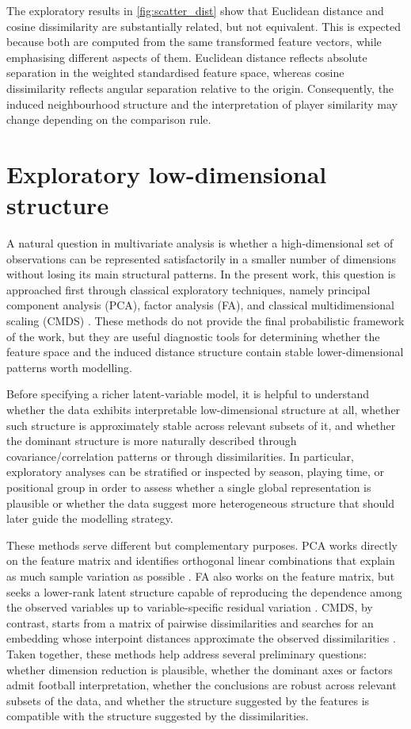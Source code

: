 The exploratory results in \autoref{fig:scatter_dist} show that Euclidean distance and cosine dissimilarity are substantially related, but not equivalent. This is expected because both are computed from the same transformed feature vectors, while emphasising different aspects of them. Euclidean distance reflects absolute separation in the weighted standardised feature space, whereas cosine dissimilarity reflects angular separation relative to the origin. Consequently, the induced neighbourhood structure and the interpretation of player similarity may change depending on the comparison rule.

\section{Exploratory low-dimensional structure}

A natural question in multivariate analysis is whether a high-dimensional set of observations can be represented satisfactorily in a smaller number of dimensions without losing its main structural patterns. In the present work, this question is approached first through classical exploratory techniques, namely principal component analysis (PCA), factor analysis (FA), and classical multidimensional scaling (CMDS) \cite{jolliffe2002pca,bartholomew2011latent,borg2005mds}. These methods do not provide the final probabilistic framework of the work, but they are useful diagnostic tools for determining whether the feature space and the induced distance structure contain stable lower-dimensional patterns worth modelling.

Before specifying a richer latent-variable model, it is helpful to understand whether the data exhibits interpretable low-dimensional structure at all, whether such structure is approximately stable across relevant subsets of it, and whether the dominant structure is more naturally described through covariance/correlation patterns or through dissimilarities. In particular, exploratory analyses can be stratified or inspected by season, playing time, or positional group in order to assess whether a single global representation is plausible or whether the data suggest more heterogeneous structure that should later guide the modelling strategy.

These methods serve different but complementary purposes. PCA works directly on the feature matrix and identifies orthogonal linear combinations that explain as much sample variation as possible \cite{jolliffe2002pca}. FA also works on the feature matrix, but seeks a lower-rank latent structure capable of reproducing the dependence among the observed variables up to variable-specific residual variation \cite{bartholomew2011latent}. CMDS, by contrast, starts from a matrix of pairwise dissimilarities and searches for an embedding whose interpoint distances approximate the observed dissimilarities \cite{borg2005mds}. Taken together, these methods help address several preliminary questions: whether dimension reduction is plausible, whether the dominant axes or factors admit football interpretation, whether the conclusions are robust across relevant subsets of the data, and whether the structure suggested by the features is compatible with the structure suggested by the dissimilarities.

